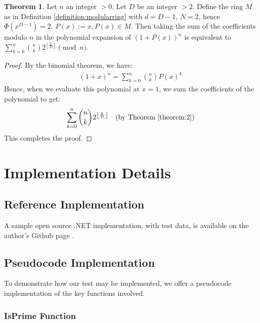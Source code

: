 \documentclass{article}
\theoremstyle{plain}
\theoremstyle{definition}
\newtheorem{theorem}{Theorem}
\begin{document}
\begin{theorem} \label{theorem:3}
Let $n$ an integer $>0$. Let $D$ be an integer $>2$. Define the ring $M$ as in Definition \ref{definition:modularring} with $d=D-1$, $N=2$, hence $\Phi(x^{D-1}) = 2$. $P(x) := x, P(x) \in M$. Then taking the sum of the coefficients modulo $n$ in the polynomial expansion of \( (1 + P(x))^n \) is equivalent to $\sum_{k=0}^{n} \binom{n}{k} 2^{\left\lfloor \frac{k}{D} \right\rfloor} \pmod{n}$.
\end{theorem}
\begin{proof}
By the binomial theorem, we have:
\begin{align}
    (1 + x)^n = \sum_{k=0}^{n} \binom{n}{k} P(x)^{k}
\end{align}
Hence, when we evaluate this polynomial at \( x = 1 \), we sum the coefficients of the polynomial to get:
\begin{align}
    \sum_{k=0}^{n} \binom{n}{k} 2^{\left\lfloor \frac{k}{D} \right\rfloor} \quad \text{(by Theorem \ref{theorem:2})}
\end{align}
This completes the proof.
\end{proof}

\section{Implementation Details}
\subsection{Reference Implementation}
 A sample open source .NET implementation, with test data, is available on the author's Github page \cite{githubrepo}.

 \subsection{Pseudocode Implementation}
To demonstrate how our test may be implemented, we offer a pseudocode implementation of the key functions involved.

\subsubsection{IsPrime Function}
\end{document}
